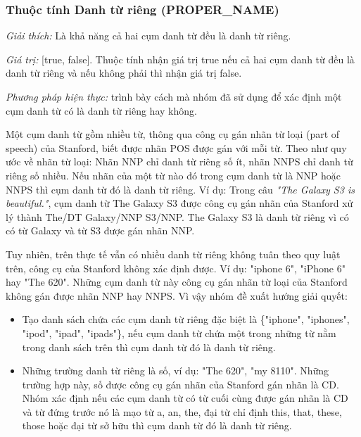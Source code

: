 \documentclass[12pt]{extarticle}
\begin{document}
			\subsubsection*{Thuộc tính Danh từ riêng (PROPER\_NAME)}
				\par \textit{Giải thích:} Là khả năng cả hai cụm danh từ đều là danh từ riêng.
				\par \textit{Giá trị:} [true, false]. Thuộc tính nhận giá trị true nếu cả hai cụm danh từ đều là danh từ riêng và nếu không phải thì nhận giá trị false.
				\par \textit{Phương pháp hiện thực:} trình bày cách mà nhóm đã sử dụng để xác định một cụm danh từ có là danh từ riêng hay không.				
				\par Một cụm danh từ gồm nhiều từ, thông qua công cụ gán nhãn từ loại (part of speech) của Stanford, biết được nhãn POS được gán với mỗi từ. Theo như quy ước về nhãn từ loại: Nhãn NNP chỉ danh từ riêng số ít, nhãn NNPS chỉ danh từ riêng số nhiều. Nếu nhãn của một từ nào đó trong cụm danh từ là NNP hoặc NNPS thì cụm danh từ đó là danh từ riêng. Ví dụ: Trong câu \textit{"The Galaxy S3 is beautiful."}, cụm danh từ The Galaxy S3 được công cụ gán nhãn của Stanford xử lý thành The/DT Galaxy/NNP S3/NNP. The Galaxy S3 là danh từ riêng vì có có từ Galaxy và từ S3 được gán nhãn NNP.
				\par Tuy nhiên, trên thực tế vẫn có nhiều danh từ riêng không tuân theo quy luật trên, công cụ của Stanford không xác định được. Ví dụ: "iphone 6", "iPhone 6" hay "The 620". Những cụm danh từ này công cụ gán nhãn từ loại của Stanford không gán được nhãn NNP hay NNPS. Vì vậy nhóm đề xuất hướng giải quyết:
				\begin{itemize}
					\item{Tạo danh sách chứa các cụm danh từ riêng đặc biệt là \{"iphone", "iphones", "ipod", "ipad", "ipads"\}, nếu cụm danh từ chứa một trong những từ nằm trong danh sách trên thì cụm danh từ đó là danh từ riêng.}
					\item{Những trường danh từ riêng là số, ví dụ: "The 620", "my 8110". Những trường hợp này, số được công cụ gán nhãn của Stanford gán nhãn là CD. Nhóm xác định nếu các cụm danh từ có từ cuối cùng được gán nhãn là CD và từ đứng trước nó là mạo từ {a, an, the}, đại từ chỉ định {this, that, these, those} hoặc đại từ sở hữu thì cụm danh từ đó là danh từ riêng.}
				\end{itemize}
\end{document}
